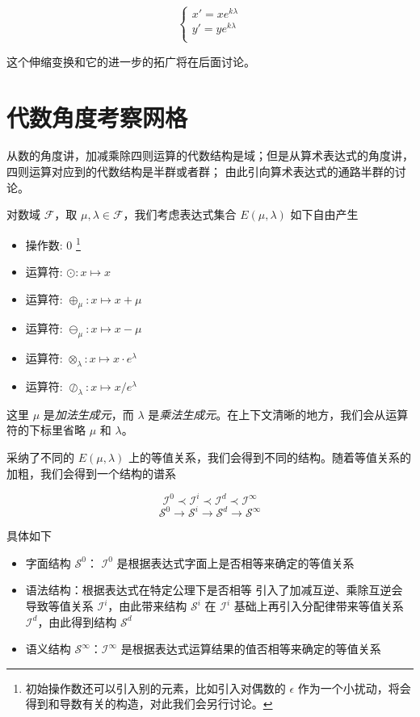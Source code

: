 \documentclass[a4paper,12pt]{article}
\numberwithin{definition}{section}
\numberwithin{lemma}{section}
\numberwithin{proposition}{section}
\numberwithin{theorem}{section}
\numberwithin{grammar}{section}
\numberwithin{program}{section}
\numberwithin{convention}{section}
\numberwithin{corollary}{section}
\begin{document}
\begin{equation}
\begin{cases}
x' = x e^{k\lambda} \\
y' = y e^{k\lambda} \\
\end{cases}
\label{eq:scale}
\end{equation}

这个伸缩变换和它的进一步的拓广将在后面讨论。

\newpage

\section{代数角度考察网格}

从数的角度讲，加减乘除四则运算的代数结构是域；但是从算术表达式的角度讲，四则运算对应到的代数结构是半群或者群；
由此引向算术表达式的通路半群的讨论。

对数域 $\mathcal{F}$，取 $\mu, \lambda \in \mathcal{F}$，我们考虑表达式集合 $E(\mu, \lambda)$ 如下自由产生
\begin{itemize}
    \item 操作数: $0$ \footnote[1]{初始操作数还可以引入别的元素，比如引入对偶数的 $\epsilon$ 作为一个小扰动，将会得到和导数有关的构造，对此我们会另行讨论。}
    \item 运算符: $\odot: x \mapsto x$
    \item 运算符: $\oplus_\mu: x \mapsto x + \mu$
    \item 运算符: $\ominus_\mu: x \mapsto x - \mu$
    \item 运算符: $\otimes_\lambda: x \mapsto x \cdot e^\lambda$
    \item 运算符: $\oslash_\lambda: x \mapsto x / e^\lambda$
\end{itemize}

这里 $\mu$ 是\emph{加法生成元}，而 $\lambda$ 是\emph{乘法生成元}。在上下文清晰的地方，我们会从运算符的下标里省略 $\mu$ 和 $\lambda$。

采纳了不同的 $E(\mu, \lambda)$ 上的等值关系，我们会得到不同的结构。随着等值关系的加粗，我们会得到一个结构的谱系

$$
  \mathcal{I}^0 \prec \mathcal{I}^i \prec \mathcal{I}^d \prec \mathcal{I}^\infty
$$
$$
  \mathcal{S}^0 \to \mathcal{S}^i \to \mathcal{S}^d \to \mathcal{S}^\infty
$$

具体如下

\begin{itemize}
    \item 字面结构 $\mathcal{S}^0$： $\mathcal{I}^0$ 是根据表达式字面上是否相等来确定的等值关系
    \item 语法结构：根据表达式在特定公理下是否相等
        \subitem 引入了加减互逆、乘除互逆会导致等值关系 $\mathcal{I}^i$，由此带来结构 $\mathcal{S}^i$
        \subitem 在 $\mathcal{I}^i$ 基础上再引入分配律带来等值关系 $\mathcal{I}^d$，由此得到结构 $\mathcal{S}^d$
    \item 语义结构 $\mathcal{S}^\infty$：$\mathcal{I}^\infty$ 是根据表达式运算结果的值否相等来确定的等值关系
\end{itemize}
\end{document}

